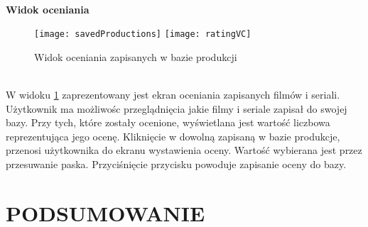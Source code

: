 \documentclass[12pt,oneside,a4paper]{report}
\begin{document}
\pagebreak
\subparagraph{}\textbf{Widok oceniania}
\begin{figure}[ht!]
	\centering
	\subfloat[]{}
	\texttt{[image: savedProductions]}
	\quad
	\subfloat[]{}
	\texttt{[image: ratingVC]}
	\caption{Widok oceniania zapisanych w bazie produkcji}
	\label{rating}
\end{figure}\\
W widoku \ref{rating} zaprezentowany jest ekran oceniania zapisanych filmów i seriali. Użytkownik ma możliwośc przeglądnięcia jakie filmy i seriale zapisał do swojej bazy. Przy tych, które zostały ocenione, wyświetlana jest wartość liczbowa reprezentująca jego ocenę. Kliknięcie w dowolną zapisaną w bazie produkcje, przenosi użytkownika do ekranu wystawienia oceny. Wartość wybierana jest przez przesuwanie paska. Przyciśnięcie przycisku powoduje zapisanie oceny do bazy. 
\chapter{PODSUMOWANIE}
\end{document}
